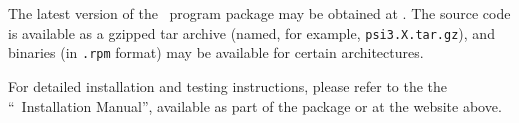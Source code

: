 The latest version of the \PSIthree\ program package may be obtained
at .
The source code is available as a gzipped tar archive (named, for
example, {\tt psi3.X.tar.gz}), and binaries (in {\tt .rpm} format) may
be available for certain architectures.

For detailed installation and testing instructions, please refer to
the the ``\PSIthree\ Installation Manual'', available as part of the
package or at the website above.

